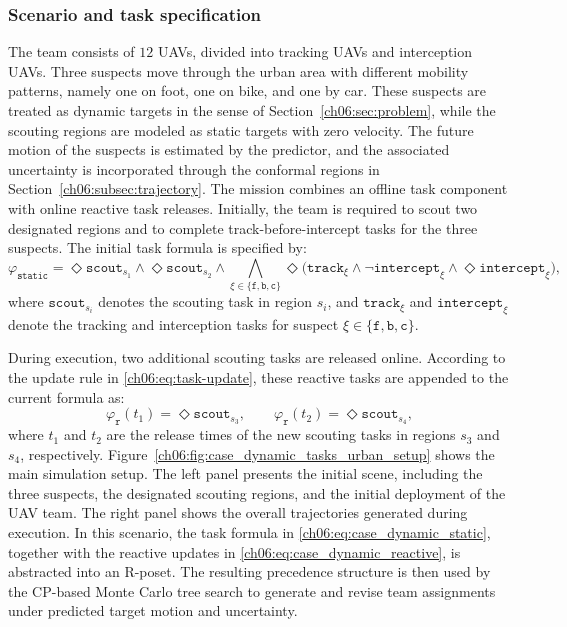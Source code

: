 \subsubsection{Scenario and task specification}
\label{ch06:subsubsec:case_dynamic_tasks_scenario}

The team consists of $12$ UAVs, divided into tracking UAVs and
interception UAVs. Three suspects move through the urban area with
different mobility patterns, namely one on foot, one on bike, and one
by car. These suspects are treated as dynamic targets in the sense of
Section~\ref{ch06:sec:problem}, while the scouting regions are
modeled as static targets with zero velocity. The future motion of the
suspects is estimated by the predictor, and the associated
uncertainty is incorporated through the conformal regions in
Section~\ref{ch06:subsec:trajectory}.
The mission combines an offline task component with online reactive
task releases. Initially, the team is required to scout two designated
regions and to complete track-before-intercept tasks for the three
suspects. The initial task formula
is specified by:
\begin{equation}
\varphi_{\texttt{static}}
=
\Diamond \texttt{scout}_{s_1}
\wedge
\Diamond \texttt{scout}_{s_2}
\wedge
\bigwedge_{\xi \in \{\texttt{f},\texttt{b},\texttt{c}\}}
\Diamond\bigl(
\texttt{track}_{\xi}
\wedge
\neg \texttt{intercept}_{\xi}
\wedge
\Diamond \texttt{intercept}_{\xi}
\bigr),
\label{ch06:eq:case_dynamic_static}
\end{equation}
where $\texttt{scout}_{s_i}$ denotes the scouting task in region
$s_i$, and $\texttt{track}_{\xi}$ and
$\texttt{intercept}_{\xi}$ denote the tracking and interception tasks
for suspect $\xi \in \{\texttt{f},\texttt{b},\texttt{c}\}$.


During execution, two additional scouting tasks are released online.
According to the update rule in \eqref{ch06:eq:task-update}, these
reactive tasks are appended to the current formula as:
\begin{equation}
\varphi_{\texttt{r}}(t_1)
=
\Diamond \texttt{scout}_{s_3},
\qquad
\varphi_{\texttt{r}}(t_2)
=
\Diamond \texttt{scout}_{s_4},
\label{ch06:eq:case_dynamic_reactive}
\end{equation}
where $t_1$ and $t_2$ are the release times of the new scouting tasks
in regions $s_3$ and $s_4$, respectively.
Figure~\ref{ch06:fig:case_dynamic_tasks_urban_setup} shows the main
simulation setup. The left panel presents the initial scene, including
the three suspects, the designated scouting regions, and the initial
deployment of the UAV team. The right panel shows the overall
trajectories generated during execution. In this scenario, the task
formula in \eqref{ch06:eq:case_dynamic_static}, together with the
reactive updates in \eqref{ch06:eq:case_dynamic_reactive}, is abstracted
into an R-poset. The resulting
precedence structure is then used by the CP-based Monte Carlo tree
search to generate and revise team
assignments under predicted target motion and uncertainty.


